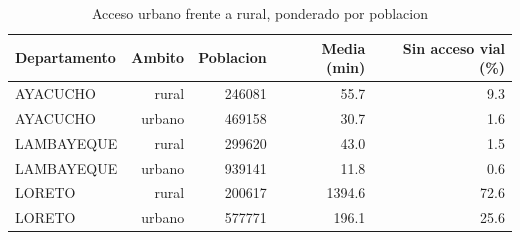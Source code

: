 \begin{table}[htbp]
\caption{Acceso urbano frente a rural, ponderado por poblacion}
\label{tab:urbano-rural}
\begin{tabular}{lrrrr}
\toprule
Departamento & Ambito & Poblacion & Media (min) & Sin acceso vial (\%) \\
\midrule
AYACUCHO & rural & 246081 & 55.7 & 9.3 \\
AYACUCHO & urbano & 469158 & 30.7 & 1.6 \\
LAMBAYEQUE & rural & 299620 & 43.0 & 1.5 \\
LAMBAYEQUE & urbano & 939141 & 11.8 & 0.6 \\
LORETO & rural & 200617 & 1394.6 & 72.6 \\
LORETO & urbano & 577771 & 196.1 & 25.6 \\
\bottomrule
\end{tabular}
\end{table}
